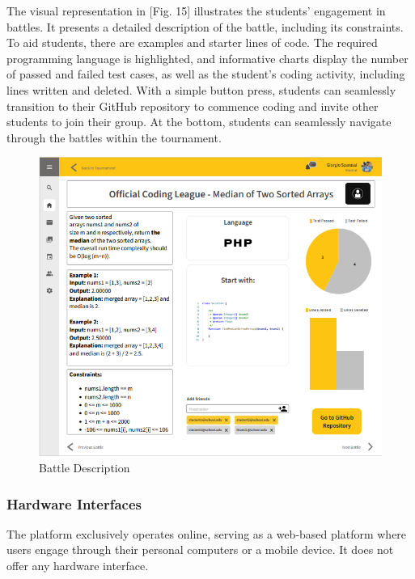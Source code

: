 \documentclass[12pt,oneside,a4paper]{article}
\begin{document}
\pagebreak

\begin{flushleft}The visual representation in [Fig. 15] illustrates the students' engagement in battles. It presents a detailed description of the battle, including its constraints. To aid students, there are examples and starter lines of code. The required programming language is highlighted, and informative charts display the number of passed and failed test cases, as well as the student's coding activity, including lines written and deleted. With a simple button press, students can seamlessly transition to their GitHub repository to commence coding and invite other students to join their group. At the bottom, students can seamlessly navigate through the battles within the tournament.
\end{flushleft}

\begin{figure}[htbp]
    \centering
    \includegraphics[width=1\linewidth]{Images/Interfaces/Student Interfaces/OngoingBattle.PNG}
    \caption{Battle Description}
    \label{fig:enter-label}
\end{figure}

\pagebreak

\subsubsection{Hardware Interfaces}
The platform exclusively operates online, serving as a web-based platform where users engage through their personal computers or a mobile device. It does not offer any hardware interface. 
\end{document}
